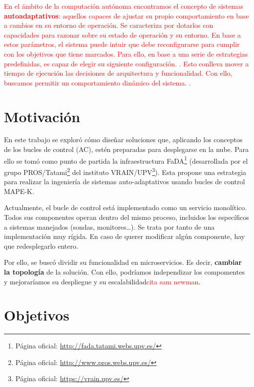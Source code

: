 \textcolor{red}{En el ámbito de la computación autónoma encontramos el concepto de sistemas \textbf{autoadaptativos}: aquellos capaces de ajustar su propio comportamiento en base a cambios en su entorno de operación. Se caracteriza por dotarlos con capacidades para razonar sobre su estado de operación y su entorno. En base a estos parámetros, el sistema puede intuir que debe reconfigurarse para cumplir con los objetivos que tiene marcados. Para ello, en base a una serie de estrategias predefinidas, es capaz de elegir su siguiente configuración. \cite{garlanIncreasingSystemDependability2003}. Esto conlleva mover a tiempo de ejecución las decisiones de arquitectura y funcionalidad. Con ello, buscamos permitir un comportamiento dinámico del sistema. \cite{brunEngineeringSelfAdaptiveSystems2009}.}

\section{Motivación}

En este trabajo se exploró cómo diseñar soluciones que, aplicando los conceptos de los bucles de control (AC), estén preparadas para desplegarse en la nube. Para ello se tomó como punto de partida la infraestructura FaDA\footnote{Página oficial: \url{http://fada.tatami.webs.upv.es/}} (desarrollada por el grupo PROS/Tatami\footnote{Página oficial: \url{http://www.pros.webs.upv.es/}} del instituto VRAIN/UPV\footnote{Página oficial: \url{https://vrain.upv.es/}}). Esta propone una estrategia para realizar la ingeniería de sistemas auto-adaptativos usando bucles de control MAPE-K\cite{ibmcorporationArchitecturalBlueprintAutonomic2006, fonsServiciosAdaptivereadyPara2021}.

Actualmente, el bucle de control está implementado como un servicio monolítico. Todos sus componentes operan dentro del mismo proceso, incluidos los específicos a sistemas manejados (sondas, monitores\dots). Se trata por tanto de una implementación muy rígida. En caso de querer modificar algún componente, hay que redesplegarlo entero.

Por ello, se buscó dividir su funcionalidad en microservicios. Es decir, \textbf{cambiar la topología} de la solución. Con ello, podríamos independizar los compomentes y mejoraríamos su despliegue y su escalabilidad\textcolor{red}{cita sam newman}.

\section{Objetivos}

